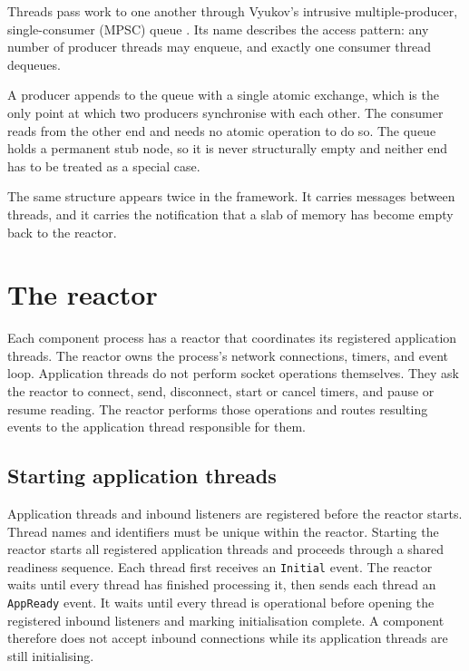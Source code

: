 Threads pass work to one another through Vyukov's intrusive
multiple-producer, single-consumer (MPSC) queue
\cite{vyukov_mpsc_queue}. Its name describes the access pattern: any number of
producer threads may enqueue, and exactly one consumer thread dequeues.

A producer appends to the queue with a single atomic exchange, which is the only
point at which two producers synchronise with each other. The consumer reads
from the other end and needs no atomic operation to do so. The queue holds a
permanent stub node, so it is never structurally empty and neither end has to
be treated as a special case.

The same structure appears twice in the framework. It carries messages between
threads, and it carries the notification that a slab of memory has become empty
back to the reactor.

\section{The reactor}
\label{sec:fw_reactor}

Each component process has a reactor that coordinates its registered
application threads. The reactor owns the process's network connections,
timers, and event loop. Application threads do not perform socket operations
themselves. They ask the reactor to connect, send, disconnect, start or cancel
timers, and pause or resume reading. The reactor performs those operations and
routes resulting events to the application thread responsible for them.

\subsection{Starting application threads}
\label{sec:fw_reactor_startup}

Application threads and inbound listeners are registered before the reactor
starts. Thread names and identifiers must be unique within the reactor.
Starting the reactor starts all registered application threads and proceeds
through a shared readiness sequence. Each thread first receives an
\texttt{Initial} event. The reactor waits until every thread has finished
processing it, then sends each thread an \texttt{AppReady} event. It waits
until every thread is operational before opening the registered inbound
listeners and marking initialisation complete. A component therefore does not
accept inbound connections while its application threads are still
initialising.

